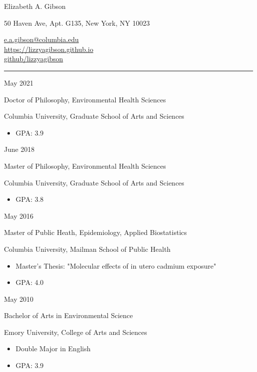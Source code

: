 \documentclass[a4paper,10pt]{article}
\newlength{\cvcolumngapwidth}
\newlength{\cvleftcolumnwidth}
\newlength{\cvrightcolumnwidth}
\newcommand{\cvnamestyle}[1]{{\LARGE\cvnamefont\textcolor{cvnamecolor}{#1}}}
\newcommand{\cvsectionstyle}[1]{{\normalsize\cvsectionfont\textcolor{cvsectioncolor}{#1}}}
\newcommand{\cvtitlestyle}[1]{{\large\cvtitlefont\textcolor{cvtitlecolor}{#1}}}
\newcommand{\cvdurationstyle}[1]{{\small\cvdurationfont\textcolor{cvdurationcolor}{#1}}}
\newlength{\cvafteritemskipamount}
\newlength{\cvaftersectionskipamount}
\newlength{\cvafternameskipamount}
\newlength{\cvaftertitleskipamount}
\newlength{\cvparskip}
\newcommand{\cvpersonalinfo}[2]{
    \begin{minipage}[t]{\cvleftcolumnwidth}
        \vspace{0mm} %
        \raggedleft #1
    \end{minipage}%
    \hspace{\cvcolumngapwidth}%
    \begin{minipage}[t]{\cvrightcolumnwidth}
        \vspace{0mm} %
        #2
    \end{minipage}

    \vspace{\cvafteritemskipamount}
}
\newcommand{\cvname}[1]{
    \cvnamestyle{#1}

    \vspace{\cvafternameskipamount}
}
\newcommand{\cvsection}[1]{
    \begin{minipage}[t]{\cvleftcolumnwidth}
        \raggedleft\cvsectionstyle{#1}
    \end{minipage}%
    \hspace{\cvcolumngapwidth}%
    \begin{minipage}[t]{\cvrightcolumnwidth}
        \textcolor{cvrulecolor}{\rule{\cvrightcolumnwidth}{0.3mm}}
    \end{minipage}

    \vspace{\cvaftersectionskipamount}
}
\newcommand{\cvitem}[2]{
    \begin{minipage}[t]{\cvleftcolumnwidth}
        \raggedleft #1
    \end{minipage}%
    \hspace{\cvcolumngapwidth}%
    \begin{minipage}[t]{\cvrightcolumnwidth}
        \setlength{\parskip}{\cvparskip} #2
    \end{minipage}

    \vspace{\cvafteritemskipamount}
}
\newcommand{\cvtitle}[1]{
    \cvtitlestyle{#1}

    \vspace{\cvaftertitleskipamount}
    \vspace{-\cvparskip}
}
\begin{document}

\cvpersonalinfo{
    \cvname{Elizabeth A. Gibson}

}{
    {
        50 Haven Ave, Apt. G135, New York, NY 10023
    }

    {
       \href{mailto:e.a.gibson@columbia.edu}{e.a.gibson@columbia.edu} \\
       \href{https://lizzyagibson.github.io/index.html}{https://lizzyagibson.github.io} \\
       \href{https://github.com/lizzyagibson}{github/lizzyagibson}
        }
    
}


\cvsection{EDUCATION}

\cvitem{
    \cvdurationstyle{May 2021}
}{
    \cvtitle{Doctor of Philosophy, Environmental Health Sciences}

    Columbia University, Graduate School of Arts and Sciences
    \begin{itemize}[leftmargin=*]
	\item GPA: 3.9
    \end{itemize}
}

\cvitem{
    \cvdurationstyle{June 2018}
}{
    \cvtitle{Master of Philosophy, Environmental Health Sciences}
    Columbia University, Graduate School of Arts and Sciences
    \begin{itemize}[leftmargin=*]
	\item GPA: 3.8
    \end{itemize}
}

\cvitem{
    \cvdurationstyle{May 2016}
}{
    \cvtitle{Master of Public Heath, Epidemiology, Applied Biostatistics}

    Columbia University, Mailman School of Public Health

    \begin{itemize}[leftmargin=*]
        \item Master's Thesis: "Molecular effects of in utero cadmium exposure"
        \item GPA: 4.0
    \end{itemize}
}

\cvitem{
    \cvdurationstyle{May 2010}
}{
    \cvtitle{Bachelor of Arts in Environmental Science}

    Emory University, College of Arts and Sciences

    \begin{itemize}[leftmargin=*]
    	\item Double Major in English
	\item GPA: 3.9
    \end{itemize}
}
\end{document}
